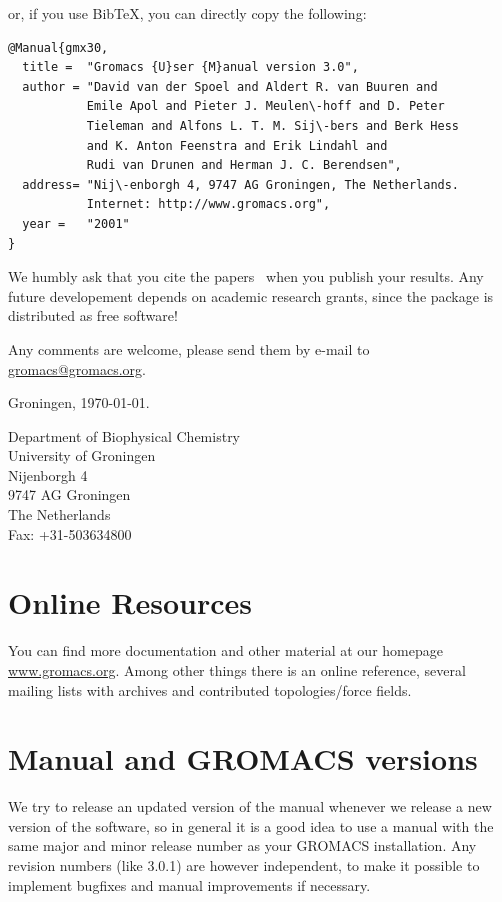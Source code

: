 \documentclass[11pt,a4paper,twoside]{gmxmanual}
\makeatletter
\newcommand{\wwwpage}{\href{http://www.gromacs.org}{www.gromacs.org}}
\newcommand{\email}{\href{mailto:gromacs@gromacs.org}{gromacs@gromacs.org}}
\makeatother
\begin{document}
or, if you use BibTeX, you can directly copy the following:
\begin{verbatim}
@Manual{gmx30,
  title =  "Gromacs {U}ser {M}anual version 3.0",
  author = "David van der Spoel and Aldert R. van Buuren and 
           Emile Apol and Pieter J. Meulen\-hoff and D. Peter 
           Tieleman and Alfons L. T. M. Sij\-bers and Berk Hess 
           and K. Anton Feenstra and Erik Lindahl and 
           Rudi van Drunen and Herman J. C. Berendsen",
  address= "Nij\-enborgh 4, 9747 AG Groningen, The Netherlands.
           Internet: http://www.gromacs.org",
  year =   "2001"
}
\end{verbatim}

We humbly ask that you cite the {\gromacs} 
papers~\cite{Berendsen95a,Lindahl2001a} when you publish your
results. Any future developement depends on academic
research grants, since the package is distributed as free software!


Any comments are welcome, please send them by e-mail to {\email}.
\medskip

Groningen, \today.
\medskip

Department of Biophysical Chemistry \\
University of Groningen \\ 
Nijenborgh 4                            \\
9747 AG Groningen                       \\
The Netherlands                         \\
Fax: +31-503634800

\newpage
\section*{Online Resources}
You can find more documentation and other material 
at our homepage \wwwpage. Among other things there is
 an online reference,
several {\gromacs} mailing lists with archives and contributed 
topologies/force fields. 


\section*{Manual and GROMACS versions}
We try to release an updated version of the manual whenever
we release a new version of the software, so in general 
it is a good idea to use a manual with the same major and
minor release number as your GROMACS installation. 
Any revision numbers (like 3.0.1) are however independent, 
to make it possible to implement bugfixes and manual
improvements if necessary. 
\end{document}
